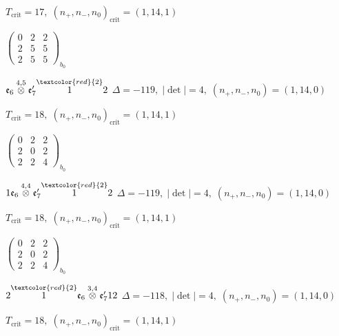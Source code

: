\documentclass[10pt]{article}
\begin{document}
\hspace{1em}$T_{\text{crit}}=17,\; (n_+,n_-,n_0)_{\text{crit}}=(1,14,1)$

\hspace{2em}$\left(\begin{smallmatrix}0 & 2 & 2 \\ 2 & 5 & 5 \\ 2 & 5 & 5\end{smallmatrix}\right)_{\!b_0}$

\smallskip

$\mathfrak{e}_6\overset{4,5}{\otimes}\mathfrak{e}_7'\overset{\textcolor{red}{2}}{1}2$ \quad $\Delta=-119,\; |\det|=4,\; (n_+,n_-,n_0)=(1,14,0)$

\hspace{1em}$T_{\text{crit}}=18,\; (n_+,n_-,n_0)_{\text{crit}}=(1,14,1)$

\hspace{2em}$\left(\begin{smallmatrix}0 & 2 & 2 \\ 2 & 0 & 2 \\ 2 & 2 & 4\end{smallmatrix}\right)_{\!b_0}$

\smallskip

$1\mathfrak{e}_6\overset{4,4}{\otimes}\mathfrak{e}_7'\overset{\textcolor{red}{2}}{1}2$ \quad $\Delta=-119,\; |\det|=4,\; (n_+,n_-,n_0)=(1,14,0)$

\hspace{1em}$T_{\text{crit}}=18,\; (n_+,n_-,n_0)_{\text{crit}}=(1,14,1)$

\hspace{2em}$\left(\begin{smallmatrix}0 & 2 & 2 \\ 2 & 0 & 2 \\ 2 & 2 & 4\end{smallmatrix}\right)_{\!b_0}$

\smallskip

$2\overset{\textcolor{red}{2}}{1}\mathfrak{e}_6\overset{3,4}{\otimes}\mathfrak{e}_7'12$ \quad $\Delta=-118,\; |\det|=4,\; (n_+,n_-,n_0)=(1,14,0)$

\hspace{1em}$T_{\text{crit}}=18,\; (n_+,n_-,n_0)_{\text{crit}}=(1,14,1)$
\end{document}
